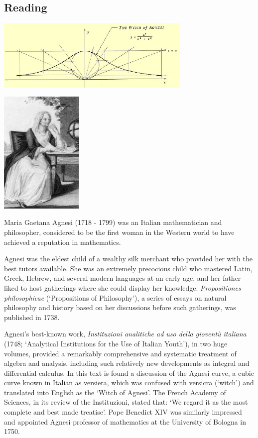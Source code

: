 


\subsection*{Reading}
\begin{center}
  \includegraphics[width=0.7\textwidth]{agnesi-curve}

  \vspace{2mm}
  \includegraphics[width=0.3\textwidth]{agnesi}
\end{center}

Maria Gaetana Agnesi (1718 - 1799) was an Italian mathematician and philosopher, considered to be the first woman in the Western world to have achieved a reputation in mathematics.

Agnesi was the eldest child of a wealthy silk merchant who provided her with the best tutors available. She was an extremely precocious child who mastered Latin, Greek, Hebrew, and several modern languages at an early age, and her father liked to host gatherings where she could display her knowledge. \textit{Propositiones philosophicae} (`Propositions of Philosophy'), a series of essays on natural philosophy and history based on her discussions before such gatherings, was published in 1738.

Agnesi’s best-known work, \textit{Instituzioni analitiche ad uso della gioventù italiana} (1748; `Analytical Institutions for the Use of Italian Youth'), in two huge volumes, provided a remarkably comprehensive and systematic treatment of algebra and analysis, including such relatively new developments as integral and differential calculus. In this text is found a discussion of the Agnesi curve, a cubic curve known in Italian as versiera, which was confused with versicra (`witch') and translated into English as the `Witch of Agnesi'. The French Academy of Sciences, in its review of the Instituzioni, stated that: `We regard it as the most complete and best made treatise'. Pope Benedict XIV was similarly impressed and appointed Agnesi professor of mathematics at the University of Bologna in 1750.

